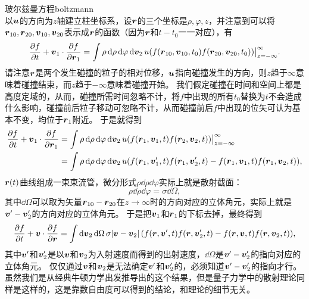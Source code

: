 \begin{back}{玻尔兹曼方程}{boltzmann}
\begin{equation}
    \end{equation}
    以$\vb*{u}$的方向为$z$轴建立柱坐标系，设$\vb*{r}$的三个坐标是$\rho, \varphi, z$，并注意到可以将$\vb*{r}_{10}, \vb*{r}_{20}, \vb*{v}_{10}, \vb*{v}_{20}$表示成$\vb*{r}$的函数（因为$\vb*{r}$和$t-t_0$一一对应），有
    \[
        \pdv{f}{t} + \vb*{v}_1 \cdot \pdv{f}{\vb*{r}_1} = \int \rho \dd{\rho} \dd{\varphi} \dd{\vb*{v}_2} u (f(\vb*{r}_{10}, \vb*{v}_{10}, t_0) f(\vb*{r}_{20}, \vb*{v}_{20}, t_0))\big|_{z=-\infty}^\infty.
    \]
    请注意$\vb*{r}$是两个发生碰撞的粒子的相对位移，$\vb*{u}$指向碰撞发生的方向，则$z$趋于$\infty$意味着碰撞结束，而$z$趋于$-\infty$意味着碰撞开始。
    我们假定碰撞在时间和空间上都是高度定域的，从而，碰撞所需时间忽略不计，将$f$中出现的所有$t_0$替换为$t$不会造成什么影响，碰撞前后粒子移动可忽略不计，从而碰撞前后$f$中出现的位矢可认为基本不变，均位于$\vb*{r}_1$附近。
    于是就得到
    \[
        \begin{aligned}
            \pdv{f}{t} + \vb*{v}_1 \cdot \pdv{f}{\vb*{r}_1} &= \int \rho \dd{\rho} \dd{\varphi} \dd{\vb*{v}_2} u (f(\vb*{r}_{1}, \vb*{v}_{1}, t) f(\vb*{r}_{2}, \vb*{v}_{2}, t))\big|_{z=-\infty}^\infty \\
            &= \int \rho \dd{\rho} \dd{\varphi} \dd{\vb*{v}_2} u (f(\vb*{r}_{1}, \vb*{v}'_{1}, t) f(\vb*{r}_{1}, \vb*{v}'_{2}, t) - f(\vb*{r}_{1}, \vb*{v}_{1}, t) f(\vb*{r}_{1}, \vb*{v}_{2}, t)),
        \end{aligned}
    \]
    $\vb*{r}(t)$曲线组成一束束流管，微分形式$\rho \dd{\rho} \dd{\varphi}$实际上就是散射截面：
    \begin{equation}
        \rho \dd{\rho} \dd{\varphi} = \sigma \dd{\Omega},
    \end{equation}
    其中$\dd{\Omega}$可以取为矢量$\vb*{r}_{10} - \vb*{r}_{20}$在$z \to \infty$时的方向对应的立体角元，实际上就是$\vb*{v}' - \vb*{v}'_2$的方向对应的立体角元。
    于是把$\vb*{v}_1$和$\vb*{r}_1$的下标去掉，最终得到
    \begin{equation}
        \pdv{f}{t} + \vb*{v} \cdot \pdv{f}{\vb*{r}} = \int \dd{\vb*{v}_2} \dd{\Omega} \sigma \abs*{\vb*{v}-\vb*{v}_2} (f(\vb*{r}, \vb*{v}', t) f(\vb*{r}, \vb*{v}'_{2}, t) - f(\vb*{r}, \vb*{v}, t) f(\vb*{r}, \vb*{v}_{2}, t)),
    \end{equation}
    其中$\vb*{v}'$和$\vb*{v}_2'$是以$\vb*{v}$和$\vb*{v}_2$为入射速度而得到的出射速度，$\dd{\Omega}$是$\vb*{v}' - \vb*{v}_2'$的指向对应的立体角元。
    仅仅通过$\vb*{v}$和$\vb*{v}_2$是无法确定$\vb*{v}'$和$\vb*{v}_2'$的，必须知道$\vb*{v}' - \vb*{v}_2'$的指向才行。
    虽然我们是从经典牛顿力学出发推导出的这个结果，但是量子力学中的散射理论同样是这样的，这是靠数自由度可以得到的结论，和理论的细节无关。


\end{back}
